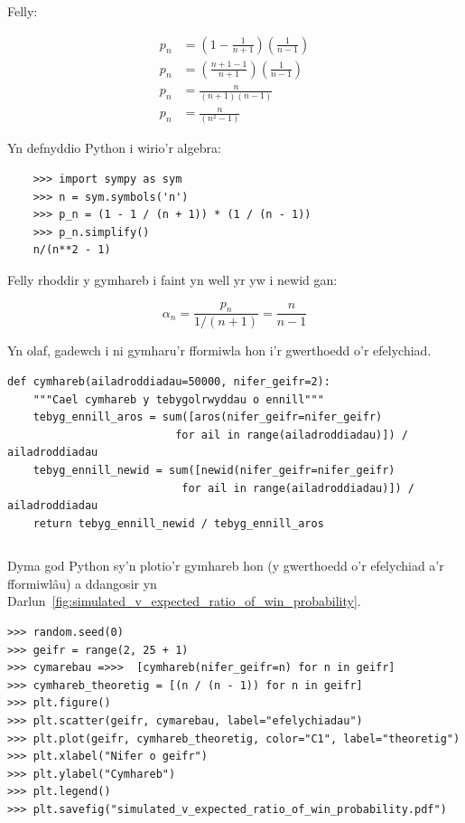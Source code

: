 \documentclass[a4paper]{article}
\begin{document}
Felly:

\begin{multicols}{2}

    \begin{align}
        p_n &= \left(1 - \frac{1}{n + 1}\right)\left(\frac{1}{n - 1}\right)\\
        p_n &= \left(\frac{n + 1 - 1}{n + 1}\right)\left(\frac{1}{n - 1}\right)\\
        p_n &= \frac{n}{(n + 1)(n - 1)}\\
        p_n &= \frac{n}{(n^2 - 1)}
    \end{align}

    \columnbreak

Yn defnyddio Python i wirio'r algebra:

    \begin{verbatim}
    >>> import sympy as sym
    >>> n = sym.symbols('n')
    >>> p_n = (1 - 1 / (n + 1)) * (1 / (n - 1))
    >>> p_n.simplify()
    n/(n**2 - 1)
    \end{verbatim}

\end{multicols}

Felly rhoddir y gymhareb i faint yn well yr yw i newid gan:

\[
    \alpha_n = \frac{p_n}{1 / (n + 1)} = \frac{n}{n - 1}
\]

Yn olaf, gadewch i ni gymharu'r fformiwla hon i'r gwerthoedd o'r efelychiad.

\begin{verbatim}
def cymhareb(ailadroddiadau=50000, nifer_geifr=2):
    """Cael cymhareb y tebygolrwyddau o ennill"""
    tebyg_ennill_aros = sum([aros(nifer_geifr=nifer_geifr) 
                          for ail in range(ailadroddiadau)]) / ailadroddiadau
    tebyg_ennill_newid = sum([newid(nifer_geifr=nifer_geifr) 
                           for ail in range(ailadroddiadau)]) / ailadroddiadau
    return tebyg_ennill_newid / tebyg_ennill_aros
\end{verbatim}

\begin{verbatim}
\end{verbatim}

Dyma god Python sy'n plotio'r gymhareb hon (y gwerthoedd o'r efelychiad a'r
fformiwl\^{a}u) a ddangosir yn
Darlun~\ref{fig:simulated_v_expected_ratio_of_win_probability}.

\begin{verbatim}
>>> random.seed(0)
>>> geifr = range(2, 25 + 1)
>>> cymarebau =>>>  [cymhareb(nifer_geifr=n) for n in geifr]
>>> cymhareb_theoretig = [(n / (n - 1)) for n in geifr]
>>> plt.figure()
>>> plt.scatter(geifr, cymarebau, label="efelychiadau")
>>> plt.plot(geifr, cymhareb_theoretig, color="C1", label="theoretig")
>>> plt.xlabel("Nifer o geifr")
>>> plt.ylabel("Cymhareb")
>>> plt.legend()
>>> plt.savefig("simulated_v_expected_ratio_of_win_probability.pdf")
\end{verbatim}
\end{document}
